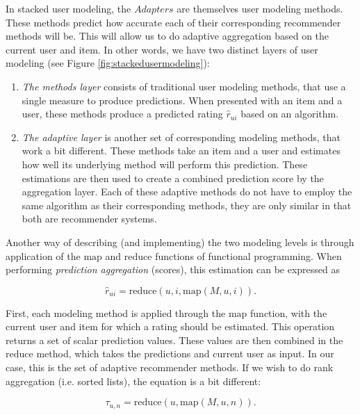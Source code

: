 In stacked user modeling, the $Adapters$ are themselves user modeling methods.
These methods predict how accurate each of their corresponding recommender methods will be.
This will allow us to do adaptive aggregation based on the current user and item.
In other words, we have two distinct layers of user modeling 
(see Figure \ref{fig:stackedusermodeling}):

\begin{enumerate}
  \item
    \emph{The methods layer} consists of traditional user modeling methods, that use a single measure to produce predictions.
    When presented with an item and a user, these methods produce a predicted rating $\hat{r}_{ui}$ based on an algorithm.
  \item
    \emph{The adaptive layer} is another set of corresponding modeling methods, that work a bit different.
    These methods take an item and a user and estimates how well its underlying method will perform this prediction.
    These estimations are then used to create a combined prediction score by the aggregation layer.
    Each of these adaptive methods do not have to employ the same algorithm as their corresponding methods,
    they are only similar in that both are recommender systems.
\end{enumerate}

Another way of describing (and implementing) the two modeling levels is through application
of the $\mathrm{map}$ and $\mathrm{reduce}$ functions of functional programming.
When performing \emph{prediction aggregation} (scores), this estimation can be expressed as

\begin{equation*}
  \hat{r}_{ui} = \mathrm{reduce}(u, i, \mathrm{map}(M, u, i)).
\end{equation*}

First, each modeling method is applied through the $\mathrm{map}$ function, with the current user and item for which
a rating should be estimated. This operation returns a set of scalar prediction values. These values are then
combined in the $\mathrm{reduce}$ method, which takes the predictions and current user as input.
In our case, this is the set of adaptive recommender methods. 
If we wish to do rank aggregation (i.e. sorted lists), the equation is a bit different:

\begin{equation*}
  \tau_{u,n} = \mathrm{reduce}(u, \mathrm{map}(M,u,n)).
\end{equation*}

